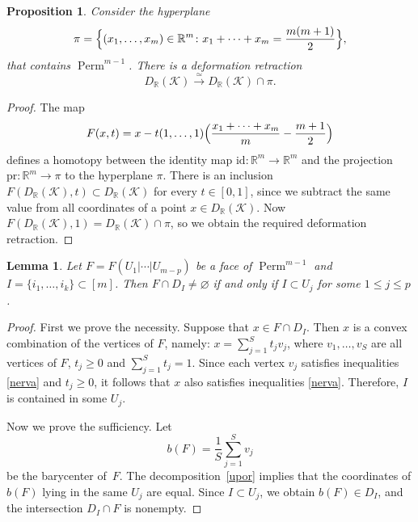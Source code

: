 \documentclass[a4paper,12pt]{amsart}
\newcommand{\K}{\mathcal K}
\newcommand{\RR}{\mathbb R}
\renewcommand{\le}{\leqslant}
\renewcommand{\ge}{\geqslant}
\newtheorem{lemma}[formula]{Lemma}
\newtheorem{proposition}[formula]{Proposition}
\theoremstyle{definition}
\theoremstyle{remark}
\numberwithin{equation}{section}
\DeclareMathOperator{\Perm}{Perm}
\begin{document}
\begin{proposition}\label{hyp}
Consider the hyperplane 
$$\pi = \Bigl\{ (x_1, \ldots, x_m) \in \RR^m \colon x_1 + \cdots + x_m = \frac{m(m+1)}{2} \Bigr\},$$
that contains $\Perm^{m-1}$. 
There is a deformation retraction $$D_{\RR}(\K) \stackrel{\simeq}\to D_{\RR}(\K) \cap \pi.$$
\end{proposition}
\begin{proof}
The map 
\[
  F(x, t) = x - t (1, \ldots, 1) \Bigl(\frac{x_1 + \cdots + x_m}{m} - \frac{m+1}{2}\Bigr)
\]
defines a homotopy between the identity map $\mathrm{id} \colon \RR^m \to \RR^m$ 
and the projection $\mathrm{pr} \colon \RR^m \to \pi$ to the hyperplane $\pi$. 
There is an inclusion $F(D_{\RR}(\K), t) \subset D_{\RR}(\K)$ for every 
$t \in [0, 1]$, since we subtract the same value from all coordinates of a point $x \in D_\RR(\K)$.
Now $F(D_{\RR}(\K), 1) = D_{\RR}(\K) \cap \pi$, so we obtain the required deformation retraction.
\end{proof}

\begin{lemma}\label{intersection}
Let $F = F(U_1 | \cdots | U_{m-p} )$ be a face of $\Perm^{m-1}$ and $I = \{i_1, \ldots, i_k \}\subset[m]$.
Then $F \cap D_I \neq \varnothing$ if and only if $I \subset U_j$ for some $1 \le j \le p$.
\end{lemma}
\begin{proof}
First we prove the necessity. Suppose that $x \in F \cap D_I$.
Then $x$ is a convex combination of the vertices of $F$, namely:
$x = \sum_{j = 1}^S t_j v_j$, where $v_1, \ldots, v_S$ are all vertices of $F$, $t_j \ge 0$ and $\sum_{j = 1}^S t_j = 1$.
Since each vertex $v_j$ satisfies inequalities \eqref{nerva} and $t_j \ge 0$, it follows that $x$ also satisfies inequalities \eqref{nerva}.  
Therefore, $I$ is contained in some $U_j$.	

Now we prove the sufficiency. Let
\[
  b(F) = \frac1S\sum_{j = 1}^S v_j
\]  
be the barycenter of~$F$.
The decomposition~\eqref{upor} implies that the coordinates of $b(F)$ lying in the same $U_j$ are equal.
Since $I \subset U_j$, we obtain $b(F) \in D_I$, and the intersection $D_I \cap F$ is nonempty.
\end{proof}
\end{document}
